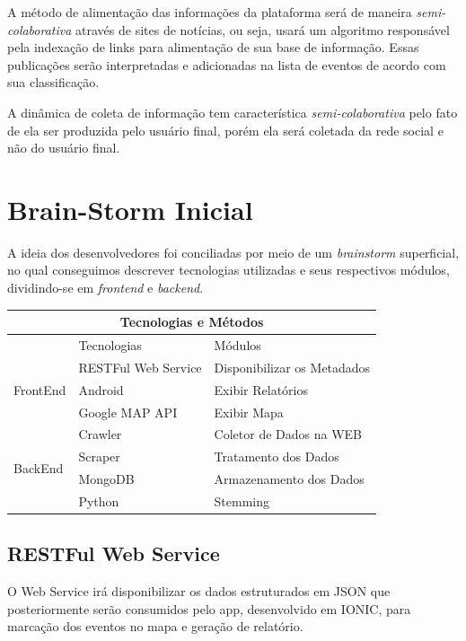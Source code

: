 \documentclass[
	12pt,				%
	openright,			%
	twoside,			%
	a4paper,			%
	english,			%
	french,				%
	spanish,			%
	brazil,				%
	]{abntex2}
\begin{document}
A método de alimentação das informações da plataforma será de maneira \textit{semi-colaborativa} através de sites de notícias, ou seja, usará um algoritmo responsável pela indexação de links para alimentação de sua base de informação. Essas publicações serão interpretadas e adicionadas na lista de eventos de acordo com sua classificação.

A dinâmica de coleta de informação tem característica \textit{semi-colaborativa} pelo fato de ela ser produzida pelo usuário final, porém ela será coletada da rede social e não do usuário final.



\chapter{Brain-Storm Inicial}


A ideia dos desenvolvedores foi conciliadas por meio de um \textit{brainstorm} superficial, no qual conseguimos descrever tecnologias utilizadas e seus respectivos módulos, dividindo-se em \textit{frontend} e \textit{backend}.

\begin{center}
	\begin{tabular}{|l|l|l|}
		\hline
		\multicolumn{3}{|c|}{Tecnologias e Métodos} \\
		\hline
				 						& Tecnologias			& Módulos \\ \hline
		\multirow{3}{*}{FrontEnd} 		& RESTFul Web Service	& Disponibilizar os Metadados \\
										& Android  				& Exibir Relatórios\\
										& Google MAP API 		& Exibir Mapa\\ \hline
		\multirow{4}{*}{BackEnd}		& Crawler 				& Coletor de Dados na WEB\\
										& Scraper 				& Tratamento dos Dados \\
										& MongoDB 				& Armazenamento dos Dados \\
				 						& Python 				& Stemming \\ \hline
	\end{tabular}
\end{center}


\section*{RESTFul Web Service}

O Web Service irá disponibilizar os dados estruturados em JSON que posteriormente serão consumidos pelo app, desenvolvido em IONIC, para marcação dos eventos no mapa e geração de relatório.
\end{document}
